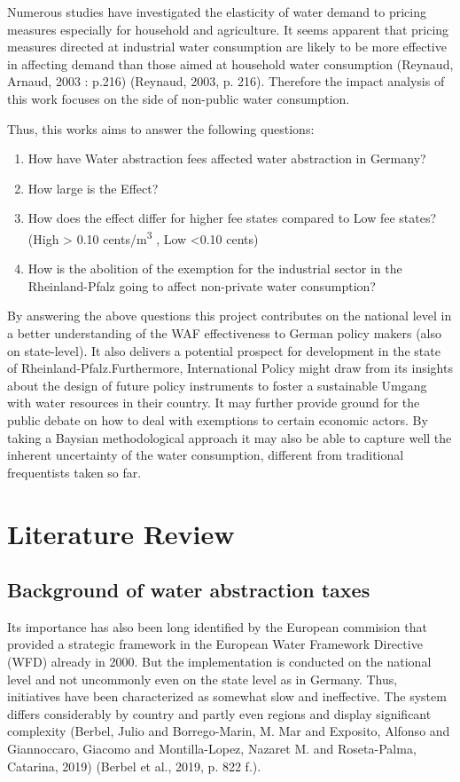 \documentclass[11pt]{article}
\begin{document}
Numerous studies have investigated the elasticity of water demand to pricing measures especially for household and agriculture. It seems apparent that pricing measures directed at industrial water consumption are likely to be more effective in affecting demand than those aimed at household water consumption (Reynaud, Arnaud, 2003 : p.216) (Reynaud, 2003, p. 216). Therefore the impact analysis of this work focuses on the side of non-public water consumption.

Thus, this works aims to answer the following questions:

\begin{enumerate}
\item How have Water abstraction fees affected water abstraction in Germany?
\item How large is the Effect?
\item How does the effect differ for higher fee states compared to Low fee states? (High > 0.10 cents/m\textsuperscript{3} , Low <0.10 cents)
\item How is the abolition of the exemption for the industrial sector in the Rheinland-Pfalz going to affect non-private water consumption?
\end{enumerate}

By answering the above questions this project contributes on the national level in a better understanding of the WAF effectiveness to German policy makers (also on state-level). It also delivers a potential prospect for development in the state of Rheinland-Pfalz.Furthermore, International Policy might draw from its insights about the design of future policy instruments to foster a sustainable Umgang with water resources in their country. It may further provide ground for the public debate on how to deal with exemptions to certain economic actors. By taking a Baysian methodological approach it may also be able to capture well the inherent uncertainty of the water consumption, different from traditional frequentists taken so far.

\section{Literature Review}
\label{sec:org216c2eb}
\label{sec:Literature Review}
\subsection{Background of water abstraction taxes}
\label{sec:org1b9f60c}
\label{sec: Background}
Its importance has also been long identified by the European commision that provided a strategic framework in the European Water Framework Directive (WFD) already in 2000. But the implementation is conducted on the national level and not uncommonly even on the state level  as in Germany. Thus, initiatives have been characterized as somewhat slow and ineffective. The system differs considerably by country and partly even regions and display significant complexity (Berbel, Julio and Borrego-Marin, M. Mar and Exposito, Alfonso and Giannoccaro, Giacomo and Montilla-Lopez, Nazaret M. and Roseta-Palma, Catarina, 2019) (Berbel et al., 2019, p. 822 f.).
\end{document}
